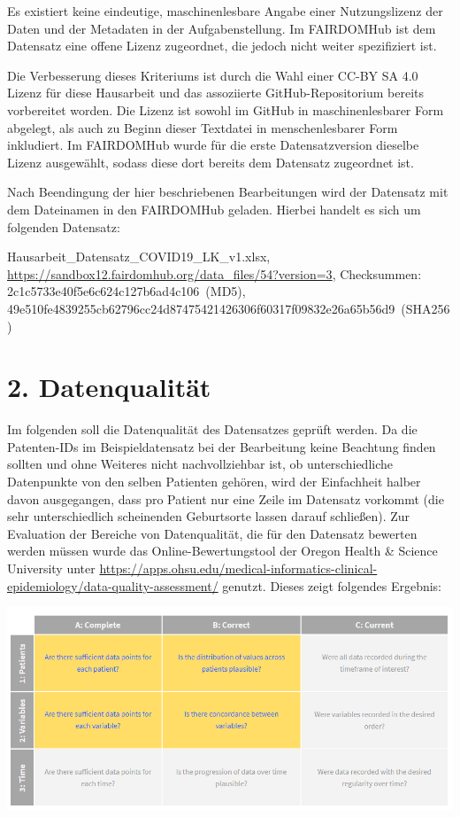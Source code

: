 \documentclass[12pt,a4paper,toc=bibliographynumbered,toc=indenttextentries]{scrreprt}
\begin{document}
\begin{description}
			Es existiert keine eindeutige, maschinenlesbare Angabe einer Nutzungslizenz der Daten und der Metadaten in der Aufgabenstellung. Im FAIRDOMHub ist dem Datensatz eine offene Lizenz zugeordnet, die jedoch nicht weiter spezifiziert ist.\par
			Die Verbesserung dieses Kriteriums ist durch die Wahl einer CC-BY SA 4.0 Lizenz für diese Hausarbeit und das assoziierte GitHub-Repositorium bereits vorbereitet worden. Die Lizenz ist sowohl im GitHub in maschinenlesbarer Form abgelegt, als auch zu Beginn dieser Textdatei in menschenlesbarer Form inkludiert.
			Im FAIRDOMHub wurde für die erste Datensatzversion dieselbe Lizenz ausgewählt, sodass diese dort bereits dem Datensatz zugeordnet ist. 
		\end{description}
		Nach Beendingung der hier beschriebenen Bearbeitungen wird der Datensatz mit dem Dateinamen in den FAIRDOMHub geladen. Hierbei handelt es sich um folgenden Datensatz:\par
		\textsf{Hausarbeit\_Datensatz\_COVID19\_LK\_v1.xlsx,  \url{https://sandbox12.fairdomhub.org/data_files/54?version=3}, Checksummen: 2c1c5733e40f5e6c624c127b6ad4c106~(MD5), 49e510fe4839255cb62796cc24d87475421426306f60317f09832e26a65b56d9~(SHA256)} 
		 
		\section*{2. Datenqualität}
		Im folgenden soll die Datenqualität des Datensatzes geprüft werden. Da die Patenten-IDs im Beispieldatensatz bei der Bearbeitung keine Beachtung finden sollten und ohne Weiteres nicht nachvollziehbar ist, ob unterschiedliche Datenpunkte von den selben Patienten gehören, wird der Einfachheit halber davon ausgegangen, dass pro Patient nur eine Zeile im Datensatz vorkommt (die sehr unterschiedlich scheinenden Geburtsorte lassen darauf schließen).
		Zur Evaluation der Bereiche von Datenqualität, die für den Datensatz bewerten werden müssen wurde das Online-Bewertungstool der Oregon Health \& Science University unter \url{https://apps.ohsu.edu/medical-informatics-clinical-epidemiology/data-quality-assessment/} genutzt.
		Dieses zeigt folgendes Ergebnis:\par
		\includegraphics[width=15.5cm]{3x3Matrix.png}
		
\end{document}
